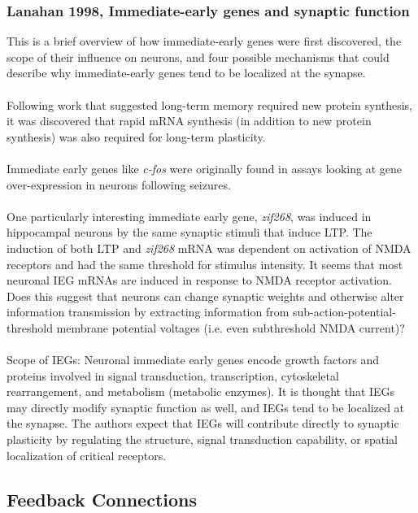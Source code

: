\documentclass{article}
\begin{document}
\subsubsection{Lanahan 1998, Immediate-early genes and synaptic function}
This is a brief overview of how immediate-early genes were first discovered, the scope of their influence on neurons, and four possible mechanisms that could describe why immediate-early genes tend to be localized at the synapse.\\
\\
Following work that suggested long-term memory required new protein synthesis, it was discovered that rapid mRNA synthesis (in addition to new protein synthesis) was also required for long-term plasticity.\\
\\
Immediate early genes like {\it{c-fos}} were originally found in assays looking at gene over-expression in neurons following seizures.\\
\\
One particularly interesting immediate early gene, {\it{zif268}}, was induced in hippocampal neurons by the same synaptic stimuli that induce LTP.  The induction of both LTP and {\it{zif268}} mRNA was dependent on activation of NMDA receptors and had the same threshold for stimulus intensity.  It seems that most neuronal IEG mRNAs are induced in response to NMDA receptor activation.  Does this suggest that neurons can change synaptic weights and otherwise alter information transmission by extracting information from sub-action-potential-threshold membrane potential voltages (i.e. even subthreshold NMDA current)? \\
\\
Scope of IEGs: Neuronal immediate early genes encode growth factors and proteins involved in signal transduction, transcription, cytoskeletal rearrangement, and metabolism (metabolic enzymes).  It is thought that IEGs may directly modify synaptic function as well, and IEGs tend to be localized at the synapse.  The authors expect that IEGs will contribute directly to synaptic plasticity by regulating the structure, signal transduction capability, or spatial localization of critical receptors.


\subsection{Feedback Connections}
\end{document}
